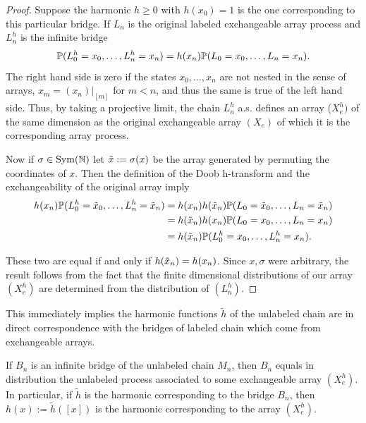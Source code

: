 \begin{proof}
Suppose the harmonic $h \geq 0$ with $h(x_0) = 1$ is the one corresponding to this particular bridge. If $L_n$ is the original labeled exchangeable array process and $L^h_n$ is the infinite bridge
%
\[\P(L^h_0 = x_0, \ldots, L^h_n = x_n) = h(x_n) \P(L_0 = x_0, \ldots, L_n = x_n).\]
%
\noindent The right hand side is zero if the states $x_0, \ldots , x_n$ are not nested in the 
sense of arrays, $x_m = (x_n) |_{[m]}$ for $m < n$, and thus the same is true of the left 
hand side. Thus, by taking a projective limit, the chain $L_n^h$ a.s. defines an array ($X^h_e)$ of 
the same dimension as the original exchangeable array $(X_e)$ of which it is the corresponding array process.

Now if $\sigma \in \operatorname{Sym}(\N)$ let $\tx := \sigma(x)$ be the array generated by permuting the coordinates of $x$. Then the definition of the Doob h-transform and the exchangeability of the original array imply
%
\begin{align*}
    h(x_n)\P(L^h_0 = \tx_0, \ldots, L^h_n = \tx_n)  & = h(x_n)h(\tx_n) \P(L_0 = \tx_0, \ldots, L_n = \tx_n) \\
    & = h(\tx_n)  h(x_n)\P(L_0 = x_0, \ldots, L_n = x_n) \\
    & = h(\tx_n)  \P(L^h_0 = x_0, \ldots, L^h_n = x_n).
\end{align*}

\noindent These two are equal if and only if $h(\tx_n) = h(x_n)$. Since $x, \sigma$ were arbitrary, the result 
follows from the fact that the finite dimensional distributions of our array 
$(X^h_e)$ are determined from the distribution of $(L_n^h)$.
\end{proof}

\noindent This immediately implies the harmonic functions $\tilde{h}$ of the
unlabeled chain are in direct correspondence with the bridges of labeled chain which
come from exchangeable arrays.

\begin{corollary}\label{cor:unlabeled_associated_to_exchangeable_array}
    If $B_n$ is an infinite bridge of the unlabeled chain $M_n$,
    then $B_n$ equals in distribution the unlabeled process associated to some
    exchangeable array $(X_e^h)$. In particular, if $\tilde{h}$ is the harmonic
    corresponding to the bridge $B_n$, then $h(x) := \tilde{h}([x])$
    is the harmonic corresponding to the array $(X_e^h)$.
\end{corollary}

